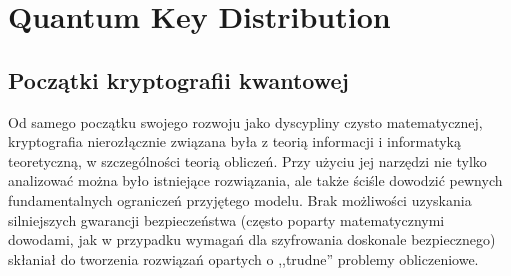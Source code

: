 \documentclass[10pt]{article}
\begin{document}

\section{Quantum Key Distribution}

\subsection{Początki kryptografii kwantowej}

Od samego początku swojego rozwoju jako dyscypliny czysto matematycznej, kryptografia nierozłącznie
związana była z teorią informacji i informatyką teoretyczną, w szczególności teorią obliczeń. Przy
użyciu jej narzędzi nie tylko analizować można było istniejące rozwiązania, ale także ściśle
dowodzić pewnych fundamentalnych ograniczeń przyjętego modelu. Brak możliwości uzyskania silniejszych
gwarancji bezpieczeństwa (często poparty matematycznymi dowodami, jak w przypadku wymagań dla 
szyfrowania doskonale bezpiecznego) skłaniał do tworzenia rozwiązań opartych o ,,trudne'' problemy
obliczeniowe. 
\end{document}
